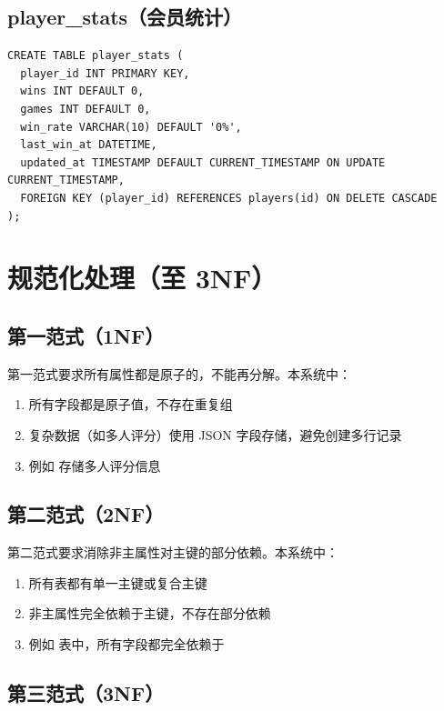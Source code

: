 \subsection{player\_stats（会员统计）}

\begin{lstlisting}
CREATE TABLE player_stats (
  player_id INT PRIMARY KEY,
  wins INT DEFAULT 0,
  games INT DEFAULT 0,
  win_rate VARCHAR(10) DEFAULT '0%',
  last_win_at DATETIME,
  updated_at TIMESTAMP DEFAULT CURRENT_TIMESTAMP ON UPDATE CURRENT_TIMESTAMP,
  FOREIGN KEY (player_id) REFERENCES players(id) ON DELETE CASCADE
);
\end{lstlisting}

\section{规范化处理（至 3NF）}

\subsection{第一范式（1NF）}

第一范式要求所有属性都是原子的，不能再分解。本系统中：

\begin{enumerate}
  \item 所有字段都是原子值，不存在重复组
  \item 复杂数据（如多人评分）使用 JSON 字段存储，避免创建多行记录
  \item 例如  存储多人评分信息
\end{enumerate}

\subsection{第二范式（2NF）}

第二范式要求消除非主属性对主键的部分依赖。本系统中：

\begin{enumerate}
  \item 所有表都有单一主键或复合主键
  \item 非主属性完全依赖于主键，不存在部分依赖
  \item 例如  表中，所有字段都完全依赖于 
\end{enumerate}

\subsection{第三范式（3NF）}

